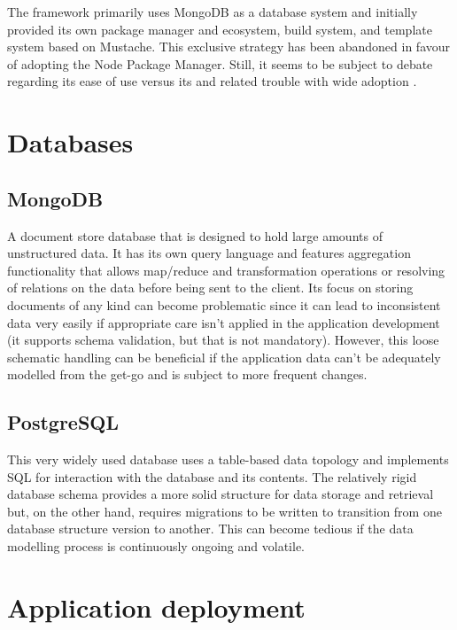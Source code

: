 The framework primarily uses MongoDB as a database system and initially provided its own package manager and ecosystem, build system, and template system based on Mustache. This exclusive strategy has been abandoned in favour of adopting the Node Package Manager. Still, it seems to be subject to debate regarding its ease of use versus its  and related trouble with wide adoption \parencite{meteorDiscussionYCombinator}.


\section{Databases}

\subsection{MongoDB}

A document store database that is designed to hold large amounts of unstructured data. It has its own query language and features aggregation functionality that allows map/reduce and transformation operations or resolving of relations on the data before being sent to the client. Its focus on storing documents of any kind can become problematic since it can lead to inconsistent data very easily if appropriate care isn't applied in the application development (it supports schema validation, but that is not mandatory). However, this loose schematic handling can be beneficial if the application data can't be adequately modelled from the get-go and is subject to more frequent changes.

\subsection{PostgreSQL}

This very widely used database uses a table-based data topology and implements \ac{SQL} for interaction with the database and its contents. The relatively rigid database schema provides a more solid structure for data storage and retrieval but, on the other hand, requires migrations to be written to transition from one database structure version to another. This can become tedious if the data modelling process is continuously ongoing and volatile.



\section{Application deployment}

